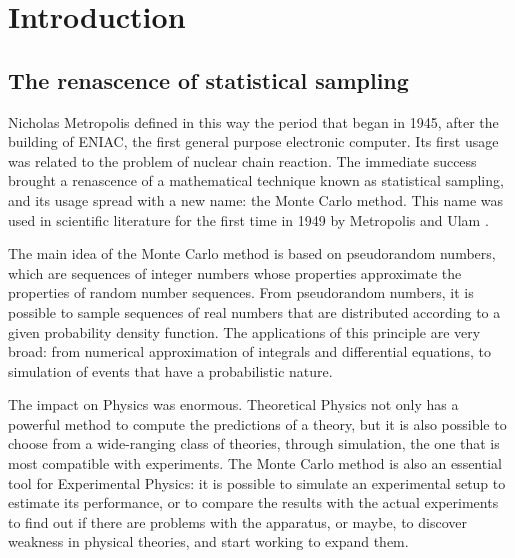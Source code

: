 {}
\begingroup
\let\clearpage\relax
\let\cleardoublepage\relax
\let\cleardoublepage\relax

\chapter*{Introduction}

\section*{The renascence of statistical sampling}
Nicholas Metropolis defined in this way \cite{metropolis:1987} the period that began in 1945, after the building of ENIAC, the first general purpose electronic computer.
Its first usage was related to the problem of nuclear chain reaction.
The immediate success brought a renascence of a mathematical technique known as statistical sampling, and its usage spread with a new name: the Monte Carlo method.
This name was used in scientific literature for the first time in 1949 by Metropolis and Ulam \cite{metropolis-ulam:1949}.

The main idea of the Monte Carlo method is based on pseudorandom numbers, which are sequences of integer numbers whose properties approximate the properties of random number sequences.
From pseudorandom numbers, it is possible to sample sequences of real numbers that are distributed according to a given probability density function.
The applications of this principle are very broad: from numerical approximation of integrals and differential equations, to simulation of events that have a probabilistic nature.

The impact on Physics was enormous. Theoretical Physics not only has a powerful method to compute the predictions of a theory, but it is also possible to choose
from a wide-ranging class of theories, through simulation, the one that is most compatible with experiments.
The Monte Carlo method is also an essential tool for Experimental Physics: it is possible to simulate an experimental setup to estimate its performance, or to compare the results with the actual experiments to find out if there are problems with the apparatus, or maybe, to discover weakness in physical theories, and start working to expand them.

